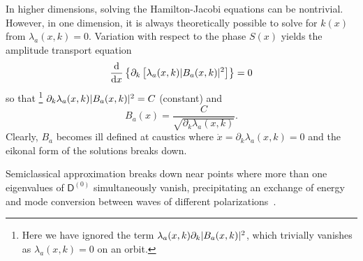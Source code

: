 In higher dimensions, solving the Hamilton-Jacobi equations can be nontrivial.
However, in one dimension, it is always theoretically possible to solve for $k(x)$ from $\lambda_{a}(x, k) = 0$.
Variation with respect to the phase $S(x)$ yields the amplitude transport equation
%
\begin{equation}
  \frac{\mathrm{d}}{\mathrm{d}{x}}\left\{\partial_{k}\left[\lambda_{a}(x, k)\lvert B_{a}(x, k)\rvert^{2}\right]\right\} = 0
\end{equation}
%
so that%
\footnote{Here we have ignored the term $\lambda_{a}(x, k)\partial_{k}\lvert B_{a}(x,k)\rvert^{2}$, which trivially vanishes as $\lambda_{a}(x, k) = 0$ on an orbit.}
$\partial_{k}\lambda_{a}(x, k)\lvert B_{a}(x, k)\rvert^{2} = C$ (constant) and
%
\begin{equation}
  B_{a}(x) = \frac{C}{\sqrt{\partial_{k}\lambda_{a}(x, k)}}.
\end{equation}
%
Clearly, $B_{a}$ becomes ill defined at caustics where $\dot{x} = \partial_{k}\lambda_{a}(x, k) = 0$ and the eikonal form of the solutions breaks down.

Semiclassical approximation breaks down near points where more than one eigenvalues of $\mathsf{D}^{(0)}$ simultaneously vanish, precipitating an exchange of energy and mode conversion between waves of different polarizations~\cite{tracy2014}.



